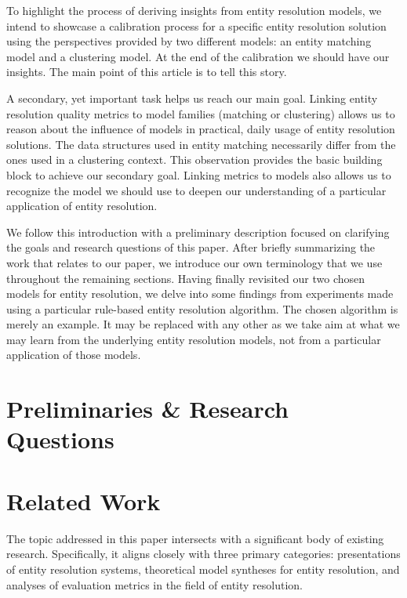 \documentclass[journal]{IEEEtran}
\begin{document}
    To highlight the process of deriving insights from entity resolution models,
    we intend to showcase a calibration process for a specific entity resolution
    solution using the perspectives provided by two different models: an entity
    matching model and a clustering model.
    At the end of the calibration we should have our insights.
    The main point of this article is to tell this story.

    A secondary, yet important task helps us reach our main goal.
    Linking entity resolution quality metrics to model families (matching or
    clustering) allows us to reason about the influence of models in practical,
    daily usage of entity resolution solutions.
    The data structures used in entity matching necessarily differ from the ones
    used in a clustering context.
    This observation provides the basic building block to achieve our secondary
    goal.
    Linking metrics to models also allows us to recognize the model we should
    use to deepen our understanding of a particular application of entity
    resolution.
    
    We follow this introduction with a preliminary description focused on
    clarifying the goals and research questions of this paper.
    After briefly summarizing the work that relates to our paper, we introduce
    our own terminology that we use throughout the remaining sections.
    Having finally revisited our two chosen models for entity resolution, we
    delve into some findings from experiments made using a particular rule-based
    entity resolution algorithm.
    The chosen algorithm is merely an example. It may be replaced with any other
    as we take aim at what we may learn from the underlying entity resolution
    models, not from a particular application of those models.

    \section{Preliminaries \& Research Questions}\label{sec:Preliminaries & Questions}
    

    \section{Related Work}\label{sec:Related Work}
    
    The topic addressed in this paper intersects with a significant body of
    existing research.
    Specifically, it aligns closely with three primary categories: presentations
    of entity resolution systems, theoretical model syntheses for entity
    resolution, and analyses of evaluation metrics in the field of entity
    resolution.
\end{document}
